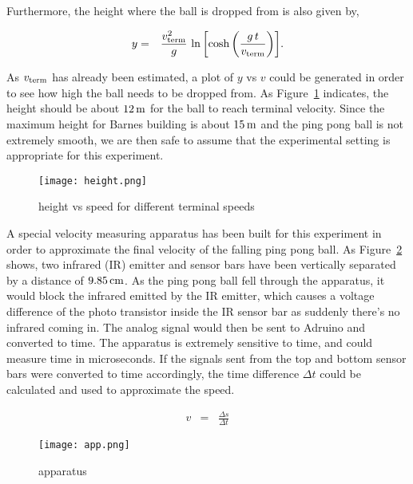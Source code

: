 \documentclass{article}
\begin{document}
\noindent Furthermore, the height where the ball is dropped from is also given by, 

\begin{eqnarray}
y&=&\frac{v_{\textnormal{term}}^{2}}{g}\,\ln\bigg[\textnormal{cosh}\,\bigg(\frac{g\,t}{v_{\textnormal{term}}}\bigg)\bigg].
\label{eqn:h}
\end{eqnarray}

\noindent As $v_{\textnormal{term}}$ has already been estimated, a plot of $y$ vs $v$ could be generated in order to see how high the ball needs to be dropped from. As Figure~\ref{fig:height} indicates, the height should be about $12\,\textnormal{m}$ for the ball to reach terminal velocity. Since the maximum height for Barnes building is about $15\,\textnormal{m}$ and the ping pong ball is not extremely smooth, we are then safe to assume that the experimental setting is appropriate for this experiment. 

\begin{figure}[H]
\centering
\texttt{[image: height.png]}
\caption{height vs speed for different terminal speeds}
\label{fig:height}
\end{figure}

\noindent A special velocity measuring apparatus has been built for this experiment in order to approximate the final velocity of the falling ping pong ball. As Figure~\ref{fig:app} shows, two infrared (IR) emitter and sensor bars have been vertically separated by a distance of $9.85\,\textnormal{cm}$. As the ping pong ball fell through the apparatus, it would block the infrared emitted by the IR emitter, which causes a voltage difference of the photo transistor inside the IR sensor bar as suddenly there's no infrared coming in. The analog signal would then be sent to Adruino and converted to time. The apparatus is extremely sensitive to time, and could measure time in microseconds. If the signals sent from the top and bottom sensor bars were converted to time accordingly, the time difference $\Delta{t}$ could be calculated and used to approximate the speed.

\begin{eqnarray}
v&=&\frac{\Delta{s}}{\Delta{t}}
\label{eqn:speed}
\end{eqnarray}

\begin{figure}[H]
\centering
\texttt{[image: app.png]}
\caption{apparatus}
\label{fig:app}
\end{figure}
\end{document}
